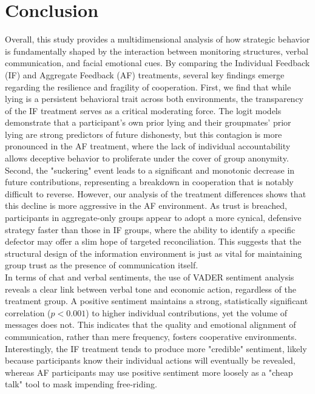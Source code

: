 \documentclass[12pt,letterpaper,english]{article}
\begin{document}
\section{Conclusion}
Overall, this study provides a multidimensional analysis of how strategic behavior is fundamentally shaped by the interaction between monitoring structures, verbal communication, and facial emotional cues. By comparing the Individual Feedback (IF) and Aggregate Feedback (AF) treatments, several key findings emerge regarding the resilience and fragility of cooperation. First, we find that while lying is a persistent behavioral trait across both environments, the transparency of the IF treatment serves as a critical moderating force. The logit models demonstrate that a participant’s own prior lying and their groupmates' prior lying are strong predictors of future dishonesty, but this contagion is more pronounced in the AF treatment, where the lack of individual accountability allows deceptive behavior to proliferate under the cover of group anonymity.\\
Second, the "suckering" event leads to a significant and monotonic decrease in future contributions, representing a breakdown in cooperation that is notably difficult to reverse. However, our analysis of the treatment differences shows that this decline is more aggressive in the AF environment. As trust is breached, participants in aggregate-only groups appear to adopt a more cynical, defensive strategy faster than those in IF groups, where the ability to identify a specific defector may offer a slim hope of targeted reconciliation. This suggests that the structural design of the information environment is just as vital for maintaining group trust as the presence of communication itself.\\
In terms of chat and verbal sentiments, the use of VADER sentiment analysis reveals a clear link between verbal tone and economic action, regardless of the treatment group. A positive sentiment maintains a strong, statistically significant correlation ($p < 0.001$) to higher individual contributions, yet the volume of messages does not. This indicates that the quality and emotional alignment of communication, rather than mere frequency, fosters cooperative environments. Interestingly, the IF treatment tends to produce more "credible" sentiment, likely because participants know their individual actions will eventually be revealed, whereas AF participants may use positive sentiment more loosely as a "cheap talk" tool to mask impending free-riding.\\
\end{document}
